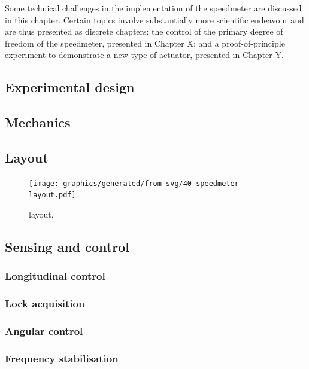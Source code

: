 Some technical challenges in the implementation of the speedmeter are discussed in this chapter. Certain topics involve substantially more scientific endeavour and are thus presented as discrete chapters: the control of the primary degree of freedom of the speedmeter, presented in Chapter X; and a proof-of-principle experiment to demonstrate a new type of actuator, presented in Chapter Y.

\subsection{Experimental design}

\subsection{Mechanics}

\subsection{Layout}

\begin{figure}
  \centering
  \texttt{[image: graphics/generated/from-svg/40-speedmeter-layout.pdf]}
  \caption[\SSMEXPT{} layout]{\label{fig:ssm-layout}\SSMEXPT{} layout.}
\end{figure}

\subsection{Sensing and control}

\subsubsection{Longitudinal control}

\subsubsection{Lock acquisition}

\subsubsection{Angular control}

\subsubsection{Frequency stabilisation}

